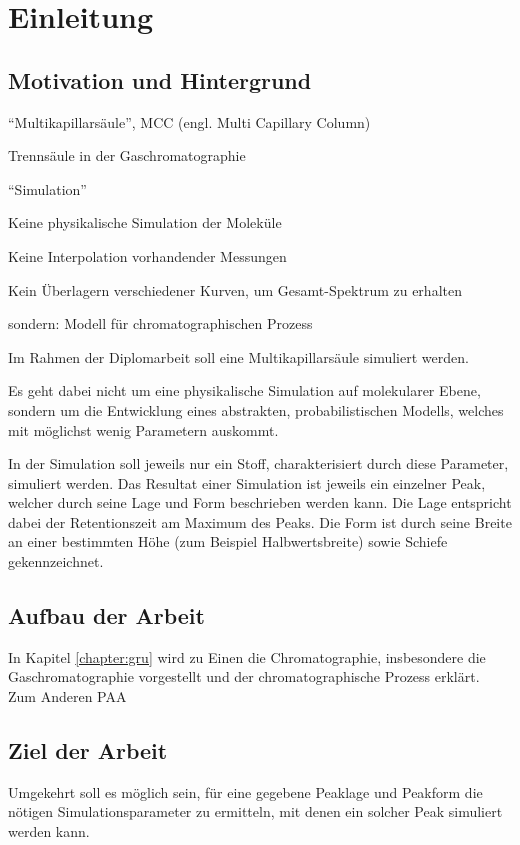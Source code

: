 \label{chapter:ein}

\chapter{Einleitung}
\section{Motivation und Hintergrund}
``Multikapillarsäule'', MCC (engl. Multi Capillary Column)

Trennsäule in der Gaschromatographie

``Simulation''

Keine physikalische Simulation der Moleküle

 Keine Interpolation vorhandender Messungen

 Kein Überlagern verschiedener Kurven, um Gesamt-Spektrum zu erhalten
 
 sondern: Modell für chromatographischen Prozess



Im Rahmen der Diplomarbeit soll eine Multikapillarsäule simuliert werden. 

Es geht dabei nicht um eine physikalische Simulation auf molekularer Ebene, sondern um die Entwicklung eines abstrakten, probabilistischen Modells, welches mit möglichst wenig Parametern auskommt. 

In der Simulation soll jeweils nur ein Stoff, charakterisiert durch diese Parameter, simuliert werden. Das Resultat einer Simulation ist jeweils ein einzelner Peak, welcher durch seine Lage und Form beschrieben werden kann. Die Lage entspricht dabei der Retentionszeit am Maximum des Peaks. Die Form ist durch seine Breite an einer bestimmten Höhe (zum Beispiel Halbwertsbreite) sowie Schiefe gekennzeichnet.



\section{Aufbau der Arbeit}
In Kapitel \ref{chapter:gru} wird zu Einen die Chromatographie, insbesondere die Gaschromatographie vorgestellt und der chromatographische Prozess erklärt. Zum Anderen PAA

\section{Ziel der Arbeit}
Umgekehrt soll es möglich sein, für eine gegebene Peaklage und Peakform die nötigen Simulationsparameter zu ermitteln, mit denen ein solcher Peak simuliert werden kann.

